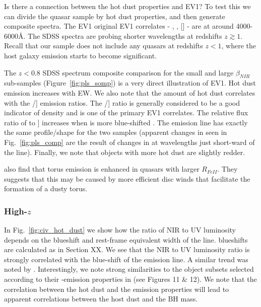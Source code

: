 Is there a connection between the hot dust properties and EV1? 
To test this we can divide the quasar sample by hot dust properties, and then generate composite spectra. 
The \ac{EV1} original EV1 correlates - , \hb, [] - are at around 4000-6000\AA. 
The \ac{SDSS} spectra are probing shorter wavelengths at redshifts $z\gtrsim1$.
Recall that our sample does not include any quasars at redshifts $z<1$, where the host galaxy emission starts to become significant. 

The $z < 0.8$ SDSS spectrum composite comparison for the small and large $\beta_{NIR}$ sub-samples (Figure~\ref{fig:pls_somp}) is a very direct illustration of EV1. 
Hot dust emission increases with  EW. 
We also note that the amount of hot dust correlates with the /] emission ratios. 
The /] ratio is generally considered to be a good indicator of density and is one of the primary EV1 correlates. 
The relative flux ratio of  to ] increases when  is more blue-shifted \citep{richards11}. 
The  emission line has exactly the same profile/shape for the two samples (apparent changes in  seen in Fig.~\ref{fig:pls_comp} are the result of changes in  at wavelengths just short-ward of the line). 
Finally, we note that objects with more hot dust are slightly redder.

\citet{shen14} also find that torus emission is enhanced in quasars with larger $R_{FeII}$.
They suggests that this may be caused by more efficient disc winds that facilitate the formation of a dusty torus. 

\subsubsection{High-$z$}

In Fig.~\ref{fig:civ_hot_dust} we show how the ratio of NIR to UV luminosity depends on the blueshift and rest-frame equivalent width of the  line.
 blueshifts are calculated as in Section XX. 
We see that the NIR to UV luminosity ratio is strongly correlated with the blue-shift of the  emission line. 
A similar trend was noted by \citet{wang13}. 
Interestingly, we note strong similarities to the object subsets selected according to their -emission properties in \citet{richards11} (see Figures 11 \& 12).  
We note that the correlation between the hot dust and the  emission properties will lead to apparent correlations between the host dust and the BH mass. 
 
